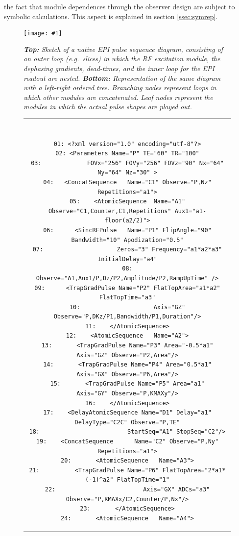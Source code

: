 \documentclass[journal,onecolumn,12pt]{IEEEtran}
\newcommand{\epsfig}[5]{
 \begin{figure}[#4!]
   \begin{center}
    \texttt{[image: \#1]}
    \caption{{\sl #2}\label{#3}}
   \end{center}
 \end{figure}}
\begin{document}
the fact that module dependences through the observer design are subject to symbolic calculations. This aspect is
explained in section \ref{ssec:symrep}.\\ \epsfig{fig/seq_tree.eps}{{\bf Top:} Sketch of a native EPI pulse sequence
  diagram, consisting of an outer loop (e.g.~slices) in which the RF excitation module, the dephasing gradients,
  dead-times, and the inner loop for the EPI readout are nested.  {\bf Bottom:} Representation of the same diagram with
  a left-right ordered tree. Branching nodes represent loops in which other modules are concatenated. Leaf nodes
  represent the modules in which the actual pulse shapes are played out.}{fig:epitree}{htbp}{1.0}
\begin{figure}[bht]
  \begin{center}
 \begin{tabular}{|c|}
  \hline
  \ \\
  \begin{minipage}[h]{1.95\columnwidth}
  {\footnotesize\begin{verbatim}
01: <?xml version="1.0" encoding="utf-8"?>
02: <Parameters Name="P" TE="60" TR="100"
03:             FOVx="256" FOVy="256" FOVz="90" Nx="64" Ny="64" Nz="30" >
04:   <ConcatSequence   Name="C1" Observe="P,Nz" Repetitions="a1">
05:    <AtomicSequence  Name="A1" Observe="C1,Counter,C1,Repetitions" Aux1="a1-floor(a2/2)">
06:      <SincRFPulse   Name="P1" FlipAngle="90" Bandwidth="10" Apodization="0.5"
07:                     Zeros="3" Frequency="a1*a2*a3" InitialDelay="a4"
08:                     Observe="A1,Aux1/P,Dz/P2,Amplitude/P2,RampUpTime" />
09:      <TrapGradPulse Name="P2" FlatTopArea="a1*a2" FlatTopTime="a3"
10:                     Axis="GZ" Observe="P,DKz/P1,Bandwidth/P1,Duration"/>
11:    </AtomicSequence>
12:    <AtomicSequence   Name="A2">
13:       <TrapGradPulse Name="P3" Area="-0.5*a1" Axis="GZ" Observe="P2,Area"/>
14:       <TrapGradPulse Name="P4" Area="0.5*a1"  Axis="GX" Observe="P6,Area"/>
15:       <TrapGradPulse Name="P5" Area="a1"      Axis="GY" Observe="P,KMAXy"/>
16:    </AtomicSequence>
17:    <DelayAtomicSequence Name="D1" Delay="a1" DelayType="C2C" Observe="P,TE"
18:                         StartSeq="A1" StopSeq="C2"/>
19:    <ConcatSequence      Name="C2" Observe="P,Ny" Repetitions="a1">
20:       <AtomicSequence   Name="A3">
21:          <TrapGradPulse Name="P6" FlatTopArea="2*a1*(-1)^a2" FlatTopTime="1"
22:                         Axis="GX" ADCs="a3" Observe="P,KMAXx/C2,Counter/P,Nx"/>
23:       </AtomicSequence>
24:       <AtomicSequence   Name="A4">

\end{verbatim}}
\end{minipage}
\end{tabular}
\end{center}
\end{figure}
\end{document}
